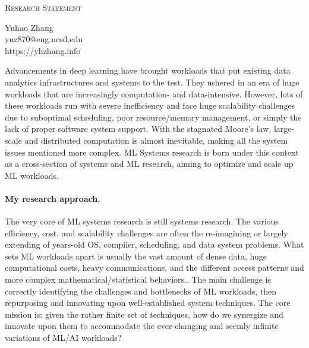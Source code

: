 \documentclass[letterpaper]{article}
\makeatletter
\newcommand{\soptitle}{Research Statement}
\newcommand{\yourname}{Yuhao Zhang}
\newcommand{\youremail}{yuz870@eng.ucsd.edu}
\newcommand{\amper}{{\fontspec[Scale=1]{Adobe Caslon Pro}\selectfont\itshape\&~{}}}
\makeatother
\begin{document}
\begin{center}{\huge \scshape \soptitle}\end{center}
\begin{center}\vspace{0.2em} {\Large \yourname\\}
  {\youremail\\} {https://yhzhang.info}\end{center}

\noindent Advancements in deep learning have brought workloads that put existing data analytics infrastructures and systems to the test. They ushered in an era of huge workloads that are increasingly computation- and data-intensive. However, lots of these workloads run with severe inefficiency and face huge scalability challenges due to suboptimal scheduling, poor resource/memory management, or simply the lack of proper software system support. With the stagnated Moore's law, large-scale and distributed computation is almost inevitable, making all the system issues mentioned more complex. ML Systems research is born under this context as a cross-section of systems and ML research, aiming to optimize and scale up ML workloads.

\paragraph{My research approach.} The very core of ML systems research is still systems research. The various efficiency, cost, and scalability challenges are often the re-imagining or largely extending of years-old OS, compiler, scheduling, and data system problems. What sets ML workloads apart is usually the vast amount of dense data, huge computational costs, heavy communications, and the different access patterns and more complex mathematical/statistical behaviors.. The main challenge is correctly identifying the challenges and bottlenecks of ML workloads, then repurposing and innovating upon well-established system techniques. The core mission is: given the rather finite set of techniques, how do we synergize and innovate upon them to accommodate the ever-changing and seemly infinite variations of ML/AI workloads? 
\end{document}
